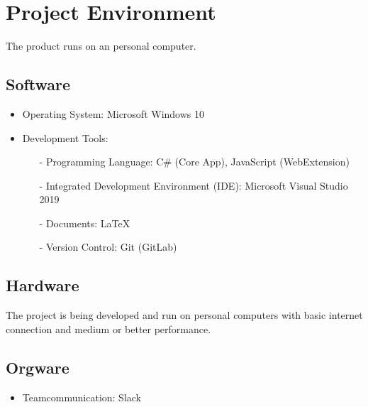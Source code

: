 \chapter{Project Environment}
\label{ch:environment}

The product runs on an personal computer.

\section{Software}
\begin{itemize}
\item Operating System: Microsoft Windows 10

\item Development Tools:
	\begin{itemize}
	\item[-] Programming Language: C\# (Core App), JavaScript (WebExtension)
	\item[-] Integrated Development Environment (IDE): Microsoft Visual Studio 2019
	\item[-] Documents: LaTeX
	\item[-] Version Control: Git (GitLab)
	\end{itemize}
\end{itemize}
\section{Hardware}

The project is being developed and run on personal computers with basic internet connection and medium or better performance.

\section{Orgware}
\begin{itemize}
\item Teamcommunication: Slack
\end{itemize}